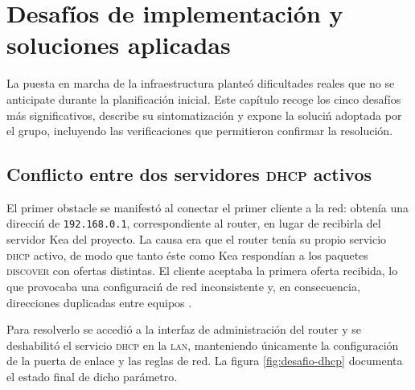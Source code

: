 
\section{Desaf\'ios de implementaci\'on y soluciones aplicadas}

La puesta en marcha de la infraestructura plante\'o dificultades reales
que no se anticipate durante la planificaci\'on inicial. Este cap\'itulo
recoge los cinco desaf\'ios m\'as significativos, describe su sintomatizaci\'on
y expone la soluci\'n adoptada por el grupo, incluyendo las verificaciones
que permitieron confirmar la resoluci\'on.

\subsection{Conflicto entre dos servidores \textsc{dhcp} activos}

El primer obstacle se manifest\'o al conectar el primer cliente a la red:
obten\'ia una direcci\'n de \texttt{192.168.0.1}, correspondiente al router,
en lugar de recibirla del servidor Kea del proyecto. La causa era que el
router ten\'ia su propio servicio \textsc{dhcp} activo, de modo que tanto
\'este como Kea respond\'ian a los paquetes \textsc{discover} con ofertas
distintas. El cliente aceptaba la primera oferta recibida, lo que
provocaba una configuraci\'n de red inconsistente y, en consecuencia,
direcciones duplicadas entre equipos \cite{rfc2131}.

Para resolverlo se accedi\'o a la interfaz de administraci\'on del router y
se deshabilit\'o el servicio \textsc{dhcp} en la \textsc{lan}, manteniendo
\'unicamente la configuraci\'on de la puerta de enlace y las reglas de
red. La figura \ref{fig:desafio-dhcp} documenta el estado final de dicho
par\'ametro.


